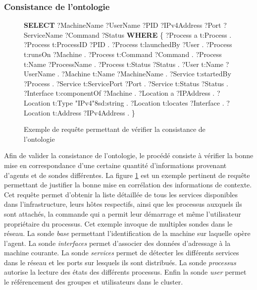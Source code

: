 \subsubsection{Consistance de l'ontologie}

\begin{figure}[h]
    \scriptsize
    \begin{myverbatim}[commandchars=\\\{\},codes={\catcode`$=3\catcode`_=8}]
\textbf{SELECT} ?MachineName ?UserName ?PID ?IPv4Address ?Port ?ServiceName ?Command ?Status
\textbf{WHERE} \{
    ?Process   a             t:Process .
    ?Process   t:ProcessID   ?PID .
    ?Process   t:launchedBy  ?User .
    ?Process   t:runsOn      ?Machine .
    ?Process   t:Command     ?Command .
    ?Process   t:Name        ?ProcessName .
    ?Process   t:Status      ?Status .
    ?User      t:Name        ?UserName .
    ?Machine   t:Name        ?MachineName .
    ?Service   t:startedBy   ?Process .
    ?Service   t:ServicePort ?Port .
    ?Service   t:Status      ?Status .
    ?Interface t:componentOf ?Machine .
    ?Location  a             ?IPAddress .
    ?Location  t:Type        "IPv4"^^xsd:string .
    ?Location  t:locates     ?Interface .
    ?Location  t:Address     ?IPv4Address .
\}
    \end{myverbatim}
    \caption{Exemple de requête permettant de vérifier la consistance de l'ontologie}
    \label{fig:sparql}
\end{figure}

Afin de valider la consistance de l'ontologie, le procédé consiste à vérifier
la bonne mise en correspondance d'une certaine quantité d'informations
provenant d'agents et de sondes différentes. La figure \ref{fig:sparql} est un
exemple pertinent de requête permettant de justifier la bonne mise en
corrélation des informations de contexte. Cet requête permet d'obtenir la liste
détaillée de tous les services disponibles dans l'infrastructure, leurs hôtes
respectifs, ainsi que les processus auxquels ils sont attachés, la commande qui a
permit leur démarrage et même l'utilisateur propriétaire du processus. Cet
exemple invoque de multiples sondes dans le réseau. La sonde \emph{base}
permettant l'identification de la machine sur laquelle opère
l'agent. La sonde \emph{interfaces} permet d'associer des données d'adressage à
la machine courante. La sonde \emph{services} permet de détecter les différents
services dans le réseau et les ports sur lesquels ils sont distribués. La sonde
\emph{processus} autorise la lecture des états des différents processus. Enfin
la sonde \emph{user} permet le référencement des groupes et utilisateurs dans le
cluster.

